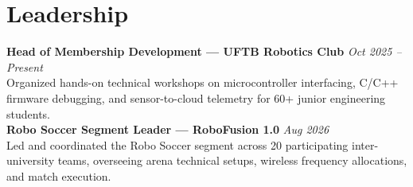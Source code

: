 \documentclass[10pt,a4paper]{article}
\begin{document}
\section*{Leadership}

\textbf{Head of Membership Development --- UFTB Robotics Club} \hfill \textit{Oct 2025 -- Present} \\
Organized hands-on technical workshops on microcontroller interfacing, C/C++ firmware debugging, and sensor-to-cloud telemetry for 60+ junior engineering students. \\[2.5pt]
\textbf{Robo Soccer Segment Leader --- RoboFusion 1.0} \hfill \textit{Aug 2026} \\
Led and coordinated the Robo Soccer segment across 20 participating inter-university teams, overseeing arena technical setups, wireless frequency allocations, and match execution.
\end{document}
